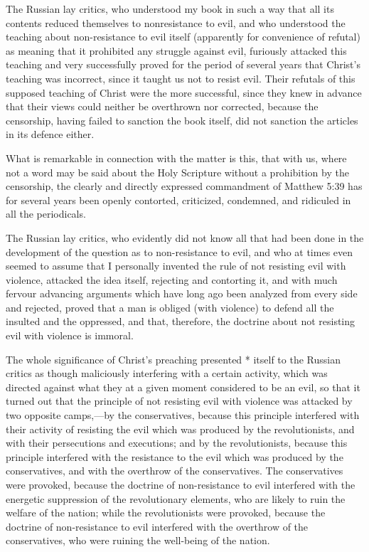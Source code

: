 \documentclass{book}
\begin{document}
The Russian lay critics, who understood my book in such a way that all its contents reduced themselves to nonresistance to evil, and who understood the teaching about non-resistance to evil itself (apparently for convenience of refutal) as meaning that it prohibited any struggle against evil, furiously attacked this teaching and very successfully proved for the period of several years that Christ’s teaching was incorrect, since it taught us not to resist evil. Their refutals of this supposed teaching of Christ were the more successful, since they knew in advance that their views could neither be overthrown nor corrected, because the censorship, having failed to sanction the book itself, did not sanction the articles in its defence either.

What is remarkable in connection with the matter is this, that with us, where not a word may be said about the Holy Scripture without a prohibition by the censorship, the clearly and directly expressed commandment of Matthew 5:39 has for several years been openly contorted, criticized, condemned, and ridiculed in all the periodicals.

The Russian lay critics, who evidently did not know all that had been done in the development of the question as to non-resistance to evil, and who at times even seemed to assume that I personally invented the rule of not resisting evil with violence, attacked the idea itself, rejecting and contorting it, and with much fervour advancing arguments which have long ago been analyzed from every side and rejected, proved that a man is obliged (with violence) to defend all the insulted and the oppressed, and that, therefore, the doctrine about not resisting evil with violence is immoral.

The whole significance of Christ’s preaching presented * itself to the Russian critics as though maliciously interfering with a certain activity, which was directed against what they at a given moment considered to be an evil, so that it turned out that the principle of not resisting evil with violence was attacked by two opposite camps,—by the conservatives, because this principle interfered with their activity of resisting the evil which was produced by the revolutionists, and with their persecutions and executions; and by the revolutionists, because this principle interfered with the resistance to the evil which was produced by the conservatives, and with the overthrow of the conservatives. The conservatives were provoked, because the doctrine of non-resistance to evil interfered with the energetic suppression of the revolutionary elements, who are likely to ruin the welfare of the nation; while the revolutionists were provoked, because the doctrine of non-resistance to evil interfered with the overthrow of the conservatives, who were ruining the well-being of the nation.
\end{document}
